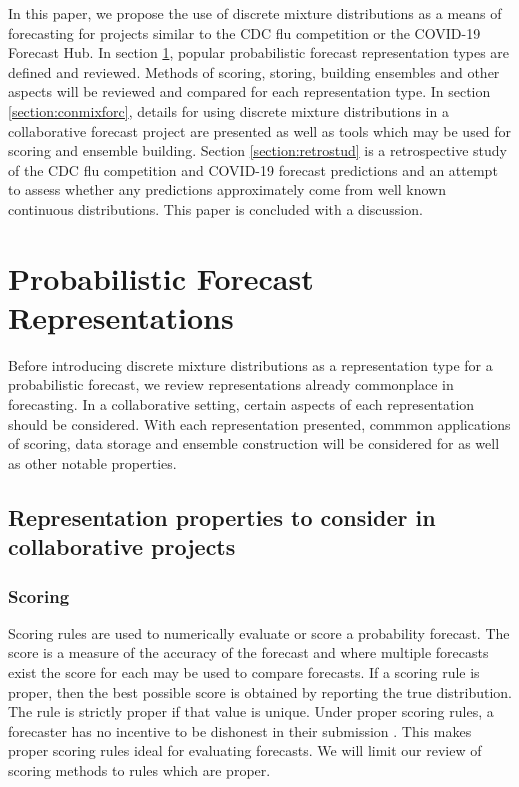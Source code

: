 \documentclass[11pt,notitlepage]{isuthesis}
\begin{document}
In this paper, we propose the use of discrete mixture distributions as a means 
of forecasting for projects similar to the CDC flu competition or the COVID-19
Forecast Hub. In section \ref{section:representations}, 
popular probabilistic forecast representation 
types are defined and reviewed. Methods of scoring, storing, building 
ensembles and other aspects will be reviewed and compared for each 
representation type.
In section \ref{section:conmixforc}, details for using discrete mixture 
distributions in a collaborative forecast project are presented as well as tools
which may be used for scoring and ensemble building.
Section \ref{section:retrostud} is a retrospective study of the CDC flu 
competition and COVID-19 
forecast predictions and an attempt to assess whether any predictions 
approximately come from well known continuous distributions. This paper is 
concluded with a discussion.






















\section{Probabilistic Forecast Representations}
\label{section:representations}

Before introducing discrete mixture distributions as a representation type for a
probabilistic forecast, we review representations already commonplace in 
forecasting. In a collaborative setting, certain aspects of each representation
should be considered. With each representation presented, 
commmon applications of 
scoring, data storage and ensemble construction will be considered for
as well as other notable properties.

\subsection{Representation properties to consider in collaborative projects}
\subsubsection{Scoring}
Scoring rules are used to numerically evaluate or score a probability forecast. 
The
score is a measure of the accuracy of the forecast and where multiple forecasts
exist the score for each may be used to compare forecasts. If a scoring rule 
is proper, then the best possible score is obtained by reporting the true 
distribution. The rule is strictly proper if that value is unique. 
Under proper
scoring rules, a forecaster has no incentive to be dishonest in their 
submission \cite{gneiting2007strictly}. This makes proper scoring rules ideal
for evaluating forecasts. We will limit our review of scoring methods to rules
which are proper.
\end{document}
